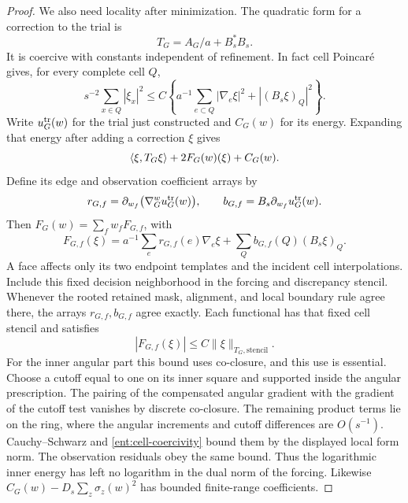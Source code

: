 \begin{proof}
We also need locality after minimization.  The quadratic form for
a correction to the trial is
\[
                 T_G=A_G/a+B_s^*B_s .
\]
It is coercive with constants independent of refinement.  In fact
cell Poincar\'e gives, for every complete cell \(Q\),
\begin{equation}\label{ent:cell-coercivity}
 s^{-2}\sum_{x\in Q}|\xi_x|^2
 \le C\left\{a^{-1}\sum_{e\subset Q}|\nabla_e\xi|^2
                         +|(B_s\xi)_Q|^2\right\}.
\end{equation}
Write \(u_G^{\rm tr}(w)\) for the trial just constructed and
\(C_G(w)\) for its energy.  Expanding that energy after adding a
correction \(\xi\) gives
\[
       \langle \xi,T_G\xi\rangle+2F_G(w)(\xi)+C_G(w).
\]
Define its edge and observation coefficient arrays by
\[
 r_{G,f}=\partial_{w_f}\bigl(\nabla_G^w u_G^{\rm tr}(w)\bigr),
 \qquad
 b_{G,f}=B_s\partial_{w_f}u_G^{\rm tr}(w).
\]
Then \(F_G(w)=\sum_fw_fF_{G,f}\), with
\[
 F_{G,f}(\xi)=a^{-1}\sum_e r_{G,f}(e)\nabla_e\xi
                 +\sum_Q b_{G,f}(Q)(B_s\xi)_Q .
\]
A face affects only its two endpoint templates and the incident
cell interpolations.  Include this fixed decision neighborhood in
the forcing and discrepancy stencil.  Whenever the rooted retained
mask, alignment, and local boundary rule agree there, the arrays
\(r_{G,f},b_{G,f}\) agree exactly.  Each functional has that fixed
cell stencil and satisfies
\[
              |F_{G,f}(\xi)|\le C\|\xi\|_{T_G,\text{stencil}}.
\]
For the inner angular part this bound uses co-closure, and this
use is essential.  Choose a cutoff equal to one on its inner square
and supported inside the angular prescription.  The pairing of
the compensated angular gradient with the gradient of the cutoff
test vanishes by discrete co-closure.  The remaining product terms
lie on the ring, where the angular increments and cutoff
differences are \(O(s^{-1})\).  Cauchy--Schwarz and
\eqref{ent:cell-coercivity} bound them by the displayed local form
norm.  The observation residuals obey the same bound.  Thus the
logarithmic inner energy has left no logarithm in the dual norm of
the forcing.  Likewise
\(C_G(w)-D_s\sum_z\sigma_z(w)^2\) has bounded finite-range
coefficients.


\end{proof}
